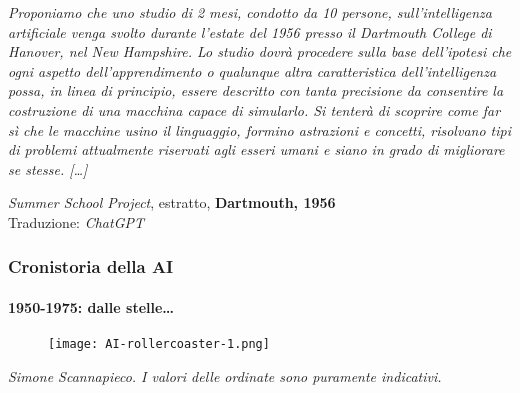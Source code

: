 \begin{frame}[t,fragile]
{{\begin{minipage}[t]{.4\textwidth}
\begin{minipage}[t]{0.45\textwidth}
\begin{figure}[ht]
			\end{figure}
		\end{minipage}
	\end{minipage}
	}
	\hfill
		\begin{minipage}[t]{.55\textwidth}
			\renewcommand{\epigraphsize}{\scriptsize}
			\setlength{\afterepigraphskip}{0pt}
			\setlength{\beforeepigraphskip}{10pt}
			\setlength{\epigraphwidth}{\textwidth}
			\epigraph{\textit{Proponiamo che uno studio di 2 mesi, condotto da 10 persone, sull'\alert{intelligenza artificiale} venga svolto durante l'estate del 1956 presso il Dartmouth College di Hanover, nel New Hampshire. Lo studio dovrà procedere sulla base dell'ipotesi che ogni aspetto dell'apprendimento o qualunque altra caratteristica dell'intelligenza possa, in linea di principio, essere descritto con tanta precisione da consentire la costruzione di una macchina capace di simularlo. Si tenterà di scoprire come far sì che le macchine usino il linguaggio, formino astrazioni e concetti, risolvano tipi di problemi attualmente riservati agli esseri umani e siano in grado di migliorare se stesse. [\ldots]
}}{\textit{Summer School Project}, estratto, \textbf{Dartmouth, 1956}\\Traduzione: \textit{\textcopyright ChatGPT}}
		\end{minipage}%
	}
\end{frame}
%
\begin{frame}[t,fragile] \frametitle{Cronistoria della AI}
	\framesubtitle{1950-1975: dalle stelle\ldots}
	\vspace*{-15pt}
	\begin{figure}[ht]
        	\centering
        	\texttt{[image: AI-rollercoaster-1.png]}
    \end{figure}
	\begin{flushright}
    	\vspace*{-10pt}
        {\tiny\textit{\textcopyright Simone Scannapieco. I valori delle ordinate sono puramente indicativi.}}
	\end{flushright}
\end{frame}
